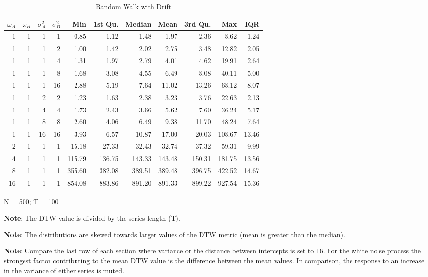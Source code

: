 \documentclass[12pt]{article}
\begin{document}
\begin{table}[!htb]
    \begin{center}
      \begin{tabular}{| r r r r | r r r r r r r |}
        \hline
        $\omega_{A}$ & $\omega_{B}$ & $\sigma^{2}_{A}$ & $\sigma^{2}_{B}$ & Min & 1st Qu. & Median & Mean & 3rd Qu. & Max & IQR \\
        \hline
        1  & 1 & 1  & 1  & 0.85   & 1.12   & 1.48   &  1.97  &  2.36  &  8.62  & 1.24  \\
        \hline
        1  & 1 & 1  & 2  & 1.00   & 1.42   & 2.02   &  2.75  &  3.48  & 12.82  & 2.05  \\
        1  & 1 & 1  & 4  & 1.31   & 1.97   & 2.79   &  4.01  &  4.62  & 19.91  & 2.64  \\
        1  & 1 & 1  & 8  & 1.68   & 3.08   & 4.55   &  6.49  &  8.08  & 40.11  & 5.00  \\
        1  & 1 & 1  & 16 & 2.88   & 5.19   & 7.64   & 11.02  & 13.26  & 68.12  & 8.07  \\
        \hline
        1  & 1 & 2  & 2  & 1.23   & 1.63   &  2.38  &  3.23  &  3.76  &  22.63 &  2.13  \\
        1  & 1 & 4  & 4  & 1.73   & 2.43   &  3.66  &  5.62  &  7.60  &  36.24 &  5.17  \\
        1  & 1 & 8  & 8  & 2.60   & 4.06   &  6.49  &  9.38  & 11.70  &  48.24 &  7.64  \\
        1  & 1 & 16 & 16 & 3.93   & 6.57   & 10.87  & 17.00  & 20.03  & 108.67 & 13.46  \\
        \hline
        2  & 1 & 1  & 1  &  15.18 &  27.33 &  32.43 &  32.74 &  37.32 &  59.31 &  9.99  \\
        4  & 1 & 1  & 1  & 115.79 & 136.75 & 143.33 & 143.48 & 150.31 & 181.75 & 13.56  \\
        8  & 1 & 1  & 1  & 355.60 & 382.08 & 389.51 & 389.48 & 396.75 & 422.52 & 14.67  \\
        16 & 1 & 1  & 1  & 854.08 & 883.86 & 891.20 & 891.33 & 899.22 & 927.54 & 15.36  \\
        \hline
      \end{tabular}
    \caption{Random Walk with Drift}
    \end{center}
    \begin{tablenotes}
        \item{\footnotesize N = 500; T = 100}
        \item {\footnotesize \textbf{Note}: The DTW value is divided by the series length (T).}
        \item {\footnotesize \textbf{Note}: The distributions are skewed towards larger values of the DTW metric (mean is greater than the median).}
        \item{\footnotesize \textbf{Note}: Compare the last row of each section where variance or the distance between intercepts is set to 16. For the white noise process the strongest factor contributing to the mean DTW value is the difference between the mean values. In comparison, the response to an increase in the variance of either series is muted.}
    \end{tablenotes}
    \label{tbl:dtw_random_walk_with_drift}
\end{table}
\end{document}
